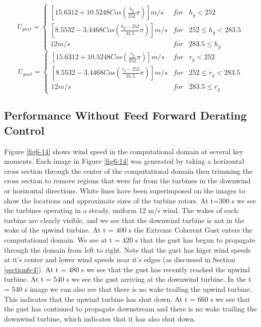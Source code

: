 \begin{equation} \label{eq6-2}
	U_{gust}=\left\{\begin{matrix}
\left [15.6312 +10.5248Cos\left ( \frac{h_g}{252 }\pi  \right )  \right ]m/s & for  & h_g<252\\ 
 \left [8.5532 -3.4468Cos\left ( \frac{h_g-252}{31.5}\pi  \right )  \right ]m/s & for  & 252 \leq h_g <283.5\\ 
 12 m/s &  for & 283.5 \leq h_g
\end{matrix}\right. 
\end{equation}
\begin{equation} \label{eq6-3}
	U_{gust}=\left\{\begin{matrix}
\left [15.6312 +10.5248Cos\left ( \frac{r_g}{252 }\pi  \right )  \right ]m/s & for  & r_g<252\\ 
 \left [8.5532 -3.4468Cos\left ( \frac{r_g-252}{31.5}\pi  \right )  \right ]m/s & for  & 252 \leq r_g <283.5\\ 
 12 m/s &  for & 283.5 \leq r_g
\end{matrix}\right. 
\end{equation}

\subsection{Performance Without Feed Forward Derating Control} \label{section6-6-2}

Figure \ref{fig6-14} shows wind speed in the computational domain at several key moments. Each image in Figure \ref{fig6-14} was generated by taking a horizontal cross section through the center of the computational domain then trimming the cross section to remove regions that were far from the turbines in the downwind or horizontal directions. White lines have been superimposed on the images to show the locations and approximate sizes of the turbine rotors. At t=300 s we see the turbines operating in a steady, uniform 12 m/s wind. The wakes of each turbine are clearly visible, and we see that the downwind turbine is not in the wake of the upwind turbine. At t = 400 s the Extreme Coherent Gust enters the computational domain. We see at t = 420 s that the gust has begun to propagate through the domain from left to right. Note that the gust has higer wind speeds at it's center and lower wind speeds near it's edges (as discussed in Section \ref{section6-4}). At t = 480 s we see that the gust has recently reached the upwind turbine. At t = 540 s we see the gust arriving at the downwind turbine. In the t = 540 s image we can also see that there is no wake trailing the upwind turbine. This indicates that the upwind turbine has shut down.
 At t = 660 s we see that the gust has continued to propagate downstream and there is no wake trailing the downwind turbine, which indicates that it has also shut down.
 

